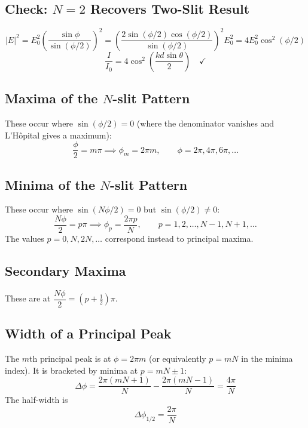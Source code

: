 \documentclass[11pt]{report}
\begin{document}
\subsection*{Check: $N=2$ Recovers Two-Slit Result}

\begin{equation}
|E|^2 = E_0^2\left(\frac{\sin\phi}{\sin(\phi/2)}\right)^2 = \left(\frac{2\sin(\phi/2)\cos(\phi/2)}{\sin(\phi/2)}\right)^2 E_0^2 = 4E_0^2\cos^2(\phi/2)
\end{equation}
\begin{equation}
\frac{I}{I_0} = 4\cos^2\!\left(\frac{kd\sin\theta}{2}\right) \quad \checkmark
\end{equation}

\subsection*{Maxima of the $N$-slit Pattern}

These occur where $\sin(\phi/2) = 0$ (where the denominator vanishes and L'Hôpital gives a maximum):
\begin{equation}
\frac{\phi}{2} = m\pi \implies \phi_m = 2\pi m, \qquad \phi = 2\pi, 4\pi, 6\pi, \ldots
\end{equation}

\subsection*{Minima of the $N$-slit Pattern}

These occur where $\sin(N\phi/2) = 0$ but $\sin(\phi/2) \neq 0$:
\begin{equation}
\frac{N\phi}{2} = p\pi \implies \phi_p = \frac{2\pi p}{N}, \qquad p = 1, 2, \ldots, N-1, N+1, \ldots
\end{equation}
The values $p = 0, N, 2N, \ldots$ correspond instead to principal maxima.

\subsection*{Secondary Maxima}

These are at $\dfrac{N\phi}{2} = (p + \tfrac{1}{2})\pi$.

\subsection*{Width of a Principal Peak}

The $m$th principal peak is at $\phi = 2\pi m$ (or equivalently $p = mN$ in the minima index). It is bracketed by minima at $p = mN \pm 1$:
\begin{equation}
\Delta\phi = \frac{2\pi(mN+1)}{N} - \frac{2\pi(mN-1)}{N} = \frac{4\pi}{N}
\end{equation}
The half-width is
\begin{equation}
\Delta\phi_{1/2} = \frac{2\pi}{N}
\end{equation}
\end{document}
